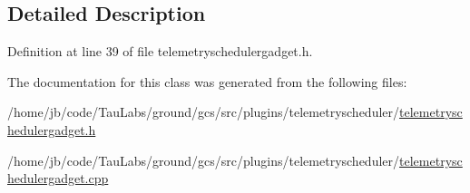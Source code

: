\subsection{\-Detailed \-Description}


\-Definition at line 39 of file telemetryschedulergadget.\-h.



\-The documentation for this class was generated from the following files\-:\begin{DoxyCompactItemize}
\item 
/home/jb/code/\-Tau\-Labs/ground/gcs/src/plugins/telemetryscheduler/\hyperlink{telemetryschedulergadget_8h}{telemetryschedulergadget.\-h}\item 
/home/jb/code/\-Tau\-Labs/ground/gcs/src/plugins/telemetryscheduler/\hyperlink{telemetryschedulergadget_8cpp}{telemetryschedulergadget.\-cpp}\end{DoxyCompactItemize}
